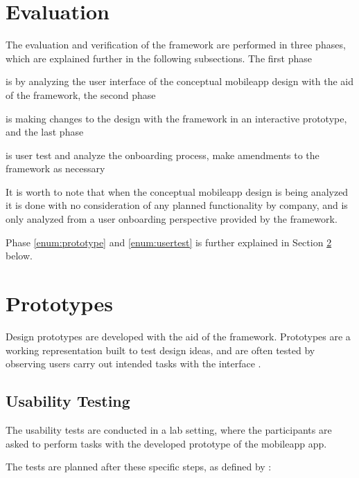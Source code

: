 \section{Evaluation}
\label{sec:evaluation}
The evaluation and verification of the framework are performed in three phases, which are explained further in the following subsections. The first phase \begin{enumerate*}[label=(\(\arabic*\))]
  \item is by analyzing the user interface of the conceptual mobileapp design with the aid of the framework, the second phase
  \item \label{enum:prototype}is making changes to the design with the framework in an interactive prototype, and the last phase
  \item \label{enum:usertest}is user test and analyze the onboarding process, make amendments to the framework as necessary
\end{enumerate*}

It is worth to note that when the conceptual mobileapp design is being analyzed it is done with no consideration of any planned functionality by company, and is only analyzed from a user onboarding perspective provided by the framework.

Phase \ref{enum:prototype} and \ref{enum:usertest} is further explained in Section \ref{subsec:prototypes} below.

\section{Prototypes}
\label{subsec:prototypes}
Design prototypes are developed with the aid of the framework. Prototypes are a working representation built to test design ideas, and are often tested by observing users carry out intended tasks with the interface \cite{Walker2002}.

\subsection{Usability Testing}
The usability tests are conducted in a lab setting, where the participants are asked to perform tasks with the developed prototype of the mobileapp app.

The tests are planned after these specific steps, as defined by \cite{Dumas1999}:


